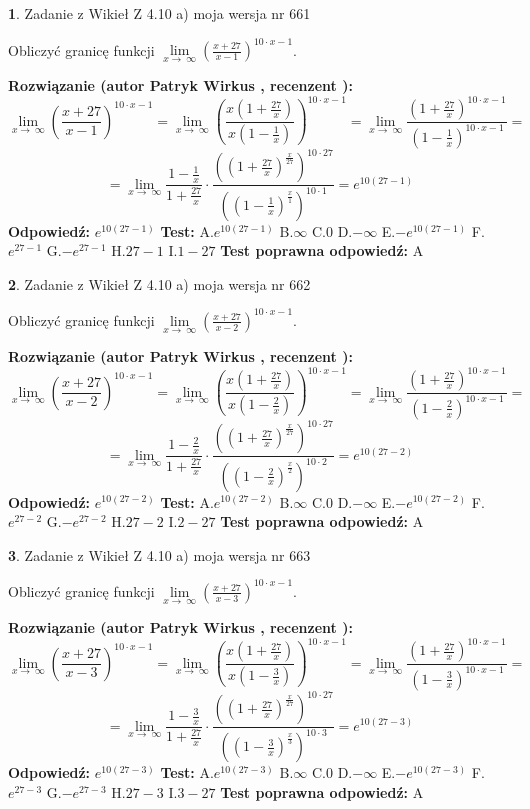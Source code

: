 \documentclass[12pt, a4paper]{article}
\theoremstyle{definition} %
\newtheorem{zad}{}
\newcommand{\zadStart}[1]{\begin{zad}#1\newline}
\newcommand{\zadStop}{\end{zad}}
\newcommand{\rozwStart}[2]{\noindent \textbf{Rozwiązanie (autor #1 , recenzent #2): }\newline}
\newcommand{\rozwStop}{\newline}
\newcommand{\odpStart}{\noindent \textbf{Odpowiedź:}\newline}
\newcommand{\odpStop}{\newline}
\newcommand{\testStart}{\noindent \textbf{Test:}\newline}
\newcommand{\testStop}{\newline}
\newcommand{\kluczStart}{\noindent \textbf{Test poprawna odpowiedź:}\newline}
\newcommand{\kluczStop}{\newline}
\begin{document}
\zadStart{Zadanie z Wikieł Z 4.10 a) moja wersja nr 661}


Obliczyć granicę funkcji  $\lim\limits_{x\to\ \infty}(\frac{x+27}{x-1})^{10\cdot x-1}$.
\zadStop
\rozwStart{Patryk Wirkus}{}
$$\lim\limits_{x\to\ \infty}(\frac{x+27}{x-1})^{10\cdot x-1} = \lim\limits_{x\to\ \infty}(\frac{x(1+\frac{27}{x})}{x(1-\frac{1}{x})})^{10\cdot x-1}=\lim\limits_{x\to\ \infty}\frac{(1+\frac{27}{x})^{10\cdot x-1}}{(1-\frac{1}{x})^{10\cdot x-1}}=$$
$$=\lim\limits_{x\to\ \infty}\frac{1-\frac{1}{x}}{1+\frac{27}{x}}\cdot\frac{((1+\frac{27}{x})^{\frac{x}{27}})^{10\cdot27}}{((1-\frac{1}{x})^{\frac{x}{1}})^{10\cdot1}}=e^{10(27-1)}$$
\rozwStop
\odpStart
$e^{10(27-1)}$
\odpStop
\testStart
A.$e^{10(27-1)}$ B.$\infty$ C.$0$ D.$-\infty$ E.$-e^{10(27-1)}$
F.$e^{27-1}$ G.$-e^{27-1}$
H.$27-1$
I.$1-27$
\testStop
\kluczStart
A
\kluczStop



\zadStart{Zadanie z Wikieł Z 4.10 a) moja wersja nr 662}


Obliczyć granicę funkcji  $\lim\limits_{x\to\ \infty}(\frac{x+27}{x-2})^{10\cdot x-1}$.
\zadStop
\rozwStart{Patryk Wirkus}{}
$$\lim\limits_{x\to\ \infty}(\frac{x+27}{x-2})^{10\cdot x-1} = \lim\limits_{x\to\ \infty}(\frac{x(1+\frac{27}{x})}{x(1-\frac{2}{x})})^{10\cdot x-1}=\lim\limits_{x\to\ \infty}\frac{(1+\frac{27}{x})^{10\cdot x-1}}{(1-\frac{2}{x})^{10\cdot x-1}}=$$
$$=\lim\limits_{x\to\ \infty}\frac{1-\frac{2}{x}}{1+\frac{27}{x}}\cdot\frac{((1+\frac{27}{x})^{\frac{x}{27}})^{10\cdot27}}{((1-\frac{2}{x})^{\frac{x}{2}})^{10\cdot2}}=e^{10(27-2)}$$
\rozwStop
\odpStart
$e^{10(27-2)}$
\odpStop
\testStart
A.$e^{10(27-2)}$ B.$\infty$ C.$0$ D.$-\infty$ E.$-e^{10(27-2)}$
F.$e^{27-2}$ G.$-e^{27-2}$
H.$27-2$
I.$2-27$
\testStop
\kluczStart
A
\kluczStop



\zadStart{Zadanie z Wikieł Z 4.10 a) moja wersja nr 663}


Obliczyć granicę funkcji  $\lim\limits_{x\to\ \infty}(\frac{x+27}{x-3})^{10\cdot x-1}$.
\zadStop
\rozwStart{Patryk Wirkus}{}
$$\lim\limits_{x\to\ \infty}(\frac{x+27}{x-3})^{10\cdot x-1} = \lim\limits_{x\to\ \infty}(\frac{x(1+\frac{27}{x})}{x(1-\frac{3}{x})})^{10\cdot x-1}=\lim\limits_{x\to\ \infty}\frac{(1+\frac{27}{x})^{10\cdot x-1}}{(1-\frac{3}{x})^{10\cdot x-1}}=$$
$$=\lim\limits_{x\to\ \infty}\frac{1-\frac{3}{x}}{1+\frac{27}{x}}\cdot\frac{((1+\frac{27}{x})^{\frac{x}{27}})^{10\cdot27}}{((1-\frac{3}{x})^{\frac{x}{3}})^{10\cdot3}}=e^{10(27-3)}$$
\rozwStop
\odpStart
$e^{10(27-3)}$
\odpStop
\testStart
A.$e^{10(27-3)}$ B.$\infty$ C.$0$ D.$-\infty$ E.$-e^{10(27-3)}$
F.$e^{27-3}$ G.$-e^{27-3}$
H.$27-3$
I.$3-27$
\testStop
\kluczStart
A
\kluczStop
\end{document}
